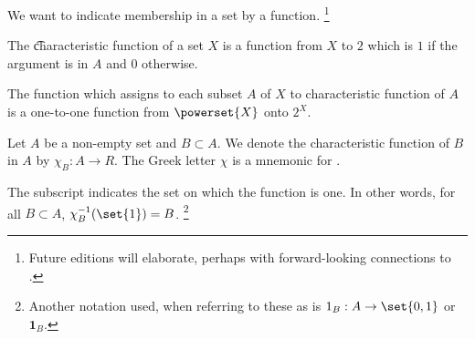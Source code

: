 

We want to indicate membership in a set by a function.
  \ifhmode\unskip\fi\footnote{
Future editions will elaborate, perhaps with forward-looking connections to .
  }


The \t{characteristic function} of a set $X$ is a function from $X$ to $2$ which is $1$ if the argument is in $A$ and 0 otherwise.

The function which assigns to each subset $A$ of $X$ to characteristic function of $A$ is a one-to-one function from $\powerset{X}$ onto $2^{X}$.


Let $A$ be a non-empty set and $B \subset A$.
We denote the characteristic function of $B$ in $A$ by $\chi _{B}: A \to R$.
The Greek letter $\chi $ is a mnemonic for .

The subscript indicates the set on which the function is one.
In other words, for all $B \subset A$, $\chi _{B}^{-1}(\set{1}) = B$.
  \ifhmode\unskip\fi\footnote{
Another notation used, when referring to these as  is $1_{B}: A \to \set{0, 1}$ or $\mathbf{1}_B$.
  }

\blankpage
